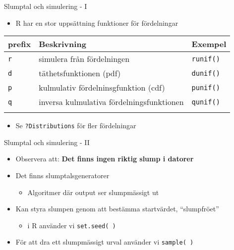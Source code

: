 \documentclass[
  11pt,
  ignorenonframetext,
  handout]{beamer}
\providecommand{\tightlist}{%
  \setlength{\itemsep}{0pt}\setlength{\parskip}{0pt}}
\newcommand\imp[1]{\alert{\textbf{#1}}}
\begin{document}
\begin{frame}[fragile]{Slumptal och simulering - I}
\label{slumptal-och-simulering---i}
\begin{itemize}
\tightlist
\item
  R har en stor uppsättning funktioner för fördelningar
\end{itemize}

\begin{longtable}[]{@{}lll@{}}
\toprule\noalign{}
prefix & Beskrivning & Exempel \\
\midrule\noalign{}
\endhead
\texttt{r} & simulera från fördelningen & \texttt{runif()} \\
\texttt{d} & täthetsfunktionen (pdf) & \texttt{dunif()} \\
\texttt{p} & kulmulativ fördelninsgfunktion (cdf) & \texttt{punif()} \\
\texttt{q} & inversa kulmulativa fördelningsfunktionen &
\texttt{qunif()} \\
\bottomrule\noalign{}
\end{longtable}

\begin{itemize}
\tightlist
\item
  Se \texttt{?Distributions} för fler fördelningar
\end{itemize}
\end{frame}

\begin{frame}{Slumptal och simulering - II}
\label{slumptal-och-simulering---ii}
\begin{itemize}
\tightlist
\item
  Observera att: \imp{Det finns ingen riktig slump i datorer}
\item
  Det finns slumptalsgeneratorer

  \begin{itemize}
  \tightlist
  \item
    Algoritmer där output ser slumpmässigt ut
  \end{itemize}
\item
  Kan styra slumpen genom att bestämma startvärdet, ``slumpfröet''

  \begin{itemize}
  \tightlist
  \item
    i R använder vi \texttt{set.seed( )}
  \end{itemize}
\item
  För att dra ett slumpmässigt urval använder vi \texttt{sample( )}
\end{itemize}
\end{frame}
\end{document}
